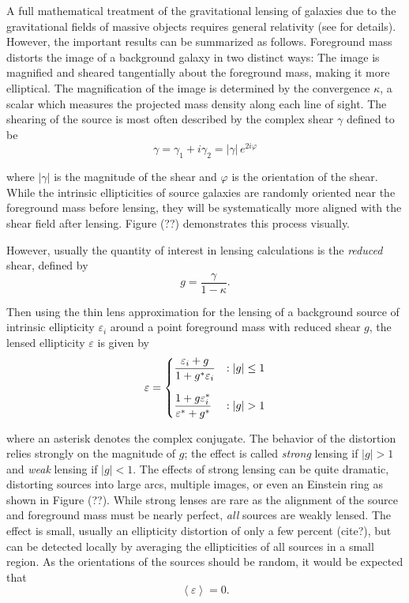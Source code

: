 \documentclass[%
 reprint,
 amsmath,amssymb,
 aps,
]{revtex4-1}
\begin{document}
A full mathematical treatment of the gravitational lensing of galaxies due to the gravitational fields of massive objects requires general relativity (see \cite{modern_cosmology} for details). However, the important results can be summarized as follows. Foreground mass distorts the image of a background galaxy in two distinct ways: The image is magnified and sheared tangentially about the foreground mass, making it more elliptical. The magnification of the image is determined by the convergence $\kappa$, a scalar which measures the projected mass density along each line of sight. The shearing of the source is most often described by the complex shear $\gamma$ defined to be
\begin{equation}\label{complex_shear}
\gamma=\gamma_1+i\gamma_2=|\gamma|\,e^{2i\varphi}
\end{equation}

\noindent where $|\gamma|$ is the magnitude of the shear and $\varphi$ is the orientation of the shear. While the intrinsic ellipticities of source galaxies are randomly oriented near the foreground mass before lensing, they will be systematically more aligned with the shear field after lensing. Figure (??) demonstrates this process visually.

However, usually the quantity of interest in lensing calculations is the \textit{reduced} shear, defined by
\begin{equation}\label{reduced_shear}
g=\frac{\gamma}{1-\kappa}.
\end{equation}

\noindent Then using the thin lens approximation for the lensing of a background source of intrinsic ellipticity $\varepsilon_i$ around a point foreground mass with reduced shear $g$, the lensed ellipticity $\varepsilon$ is given by
\begin{equation}\label{lensing}
 \varepsilon = \begin{dcases} 
      \frac{\varepsilon_i+g}{1+g^*\varepsilon_i} & : |g|\leq1 \\[0.75em]
       \frac{1+g\varepsilon_i^*}{\varepsilon^*+g^*} & : |g|>1
   \end{dcases}
\end{equation}

\noindent where an asterisk denotes the complex conjugate\cite{schneider}. The behavior of the distortion relies strongly on the magnitude of $g$; the
effect is called \textit{strong} lensing if $|g|>1$ and \textit{weak} lensing if $|g|<1$. The effects of strong lensing can be quite dramatic, distorting sources into large arcs, multiple images, or even an Einstein ring as shown in Figure (??). While strong lenses are rare as the alignment of the source and foreground mass must be nearly perfect, \textit{all} sources are weakly lensed. The effect is small, usually an ellipticity distortion of only a few percent (cite?), but can be detected locally by averaging the ellipticities of all sources in a small region. As the orientations of the sources should be random, it would be expected that
$$\left<\varepsilon\right>=0.$$
\end{document}
